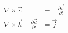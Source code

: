 \begin{equation}
\begin{split}
    \nabla \times \vec{e} &= -\frac{\partial \vec{b}}{\partial t} \\
    \nabla \times \vec{h} - \frac{\partial \vec{d}}{\partial t} &= \vec{j}
\end{split}
\label{eq:maxwell_time_full}
\end{equation}
